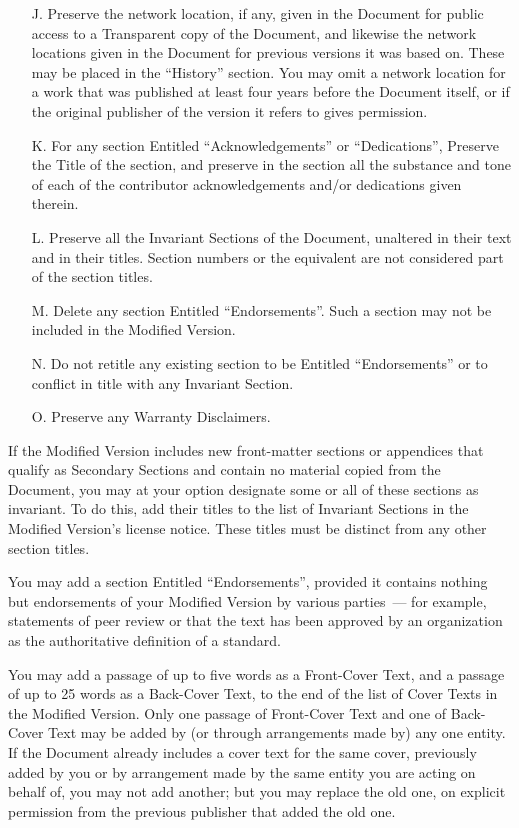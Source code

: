 \documentclass[12pt,a4paper,openany]{book}
\begin{document}
\begin{itemize}
\item[J.] Preserve the network location, if any, given in the Document for
public access to a Transparent copy of the Document, and likewise the
network locations given in the Document for previous versions it was based
on.  These may be placed in the “History” section.  You may omit a network
location for a work that was published at least four years before the
Document itself, or if the original publisher of the version it refers to
gives permission.
 
\item[K.] For any section Entitled “Acknowledgements” or “Dedications”,
Preserve the Title of the section, and preserve in the section all the
substance and tone of each of the contributor acknowledgements and/or
dedications given therein.
 
\item[L.] Preserve all the Invariant Sections of the Document, unaltered in
their text and in their titles. Section numbers or the equivalent are not
considered part of the section titles.
 
\item[M.] Delete any section Entitled “Endorsements”.  Such a section may
not be included in the Modified Version.
 
\item[N.] Do not retitle any existing section to be Entitled
“Endorsements” or to conflict in title with any Invariant Section.
 
\item[O.] Preserve any Warranty Disclaimers.

\end{itemize}

If the Modified Version includes new front-matter sections or appendices
that qualify as Secondary Sections and contain no material copied from the
Document, you may at your option designate some or all of these sections as
invariant.  To do this, add their titles to the list of Invariant Sections
in the Modified Version’s license notice.  These titles must be distinct
from any other section titles.

You may add a section Entitled “Endorsements”, provided it contains
nothing but endorsements of your Modified Version by various parties~— for
example, statements of peer review or that the text has been approved by an
organization as the authoritative definition of a standard.

You may add a passage of up to five words as a Front-Cover Text, and a
passage of up to 25 words as a Back-Cover Text, to the end of the list of
Cover Texts in the Modified Version.  Only one passage of Front-Cover Text
and one of Back-Cover Text may be added by (or through arrangements made
by) any one entity.  If the Document already includes a cover text for the
same cover, previously added by you or by arrangement made by the same
entity you are acting on behalf of, you may not add another; but you may
replace the old one, on explicit permission from the previous publisher
that added the old one.
\end{document}
